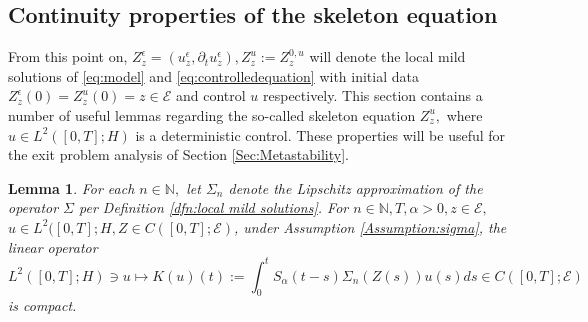 \documentclass[10pt, reqno]{amsart}
\newcommand{\N}{\mathbb{N}}
\newcommand{\e}{\mathcal{E}}
\newtheorem{lem}{Lemma}
\theoremstyle{definition}
\numberwithin{lem}{section}
\numberwithin{cor}{section}
\numberwithin{prop}{section}
\numberwithin{thm}{section}
\numberwithin{dfn}{section}
\begin{document}
\subsection{Continuity properties of the skeleton equation}\label{sec:skeletoncontinuity} From this point on, $Z^\epsilon_z=(u^\epsilon_z,\partial_tu^\epsilon_z), Z^{u}_z:=Z^{0,u}_z$ will denote the local mild solutions of \eqref{eq:model} and \eqref{eq:controlledequation} with initial data $Z^\epsilon_z(0)=Z^u_z(0)=z\in\e$ and control $u$  respectively. This section contains a number of useful lemmas regarding the so-called skeleton equation $Z_z^{u},$ where $u\in L^2([0,T];H)$ is a deterministic control. These properties will be useful for the exit problem analysis of Section \ref{Sec:Metastability}.



\begin{lem}\label{lem:Zaprioricompactnesslem}
	For each $n\in\N,$ let $\Sigma_n$ denote the Lipschitz approximation of the operator $\Sigma$ per Definition \ref{dfn:local mild solutions}. For $n
    \in\N, T,\alpha>0, z\in\mathcal{E},$ $u\in L^2([0,T]; H, Z\in C([0,T];\e)$,
 under Assumption \ref{Assumption:sigma}, the linear operator 
	$$L^2([0,T];H)\ni u\longmapsto   K(u)(t):= \int_{0}^{t}S_\alpha(t-s)\Sigma_n(Z(s))u(s)ds\in C([0,T];\e) $$
	is compact.		
\end{lem}
\end{document}
